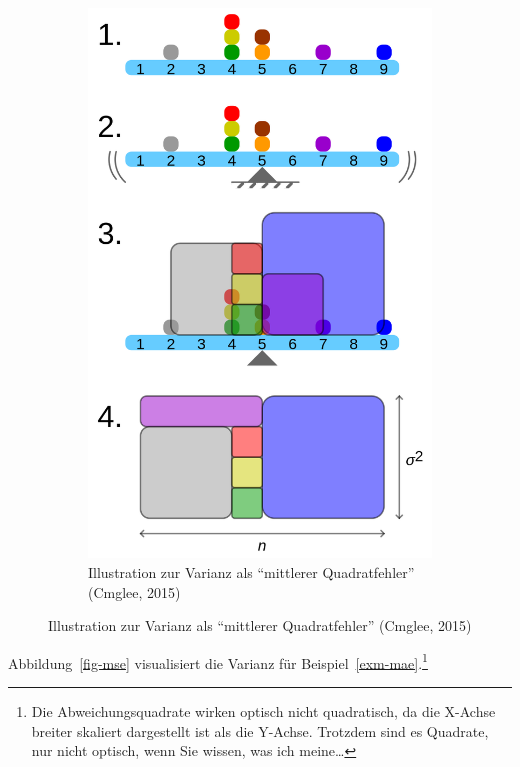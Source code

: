 \documentclass[
  a4paper,
]{scrbook}
\theoremstyle{definition}
\theoremstyle{definition}
\theoremstyle{definition}
\theoremstyle{remark}
\begin{document}
\begin{figure}
\begin{minipage}{0.40\linewidth}
\begin{figure}[H]
{\includegraphics{img/Variance_visualisation.svg.png}

}

\caption{\label{fig-var}Illustration zur Varianz als ``mittlerer
Quadratfehler'' (Cmglee, 2015)}

\end{figure}%

\end{minipage}%

\end{figure}%

Abbildung~\ref{fig-mse} visualisiert die Varianz für
Beispiel~\ref{exm-mae}.\footnote{Die Abweichungsquadrate wirken optisch
  nicht quadratisch, da die X-Achse breiter skaliert dargestellt ist als
  die Y-Achse. Trotzdem sind es Quadrate, nur nicht optisch, wenn Sie
  wissen, was ich meine\ldots{}}
\end{document}
